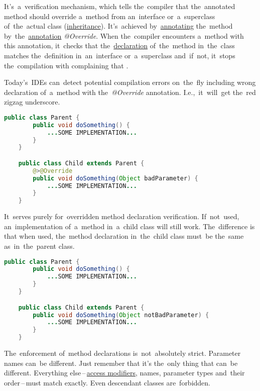 \label{javaoverride}
It's~a~verification mechanism, which tells the~compiler that the~annotated method should override a~method from an~interface or~a~superclass of~the~actual class (\hyperref[inheritance]{inheritance}).
It's~achieved by~\hyperref[javaannotation]{annotating} the~method by~the~\hyperref[javaannotation]{annotation} \textit{@Override}.
When the~compiler encounters a~method with this annotation, it~checks that the~\hyperref[declarationdefinition]{declaration} of~the~method in~the~class matches the~definition in~an~interface or~a~superclass and~if~not, it~stops the~compilation with complaining that .

\note Today's~IDEs can~detect potential compilation errors on~the~fly including wrong declaration of~a~method with the~\textit{@Override} annotation.
I.e.,~it~will~get the~red zigzag underscore.

\begin{lstlisting}[language=Java]
    public class Parent {
        public void doSomething() {
            ...SOME IMPLEMENTATION...
        }
    }

    public class Child extends Parent {
        @>@Override
        public void doSomething(Object badParameter) {
            ...SOME IMPLEMENTATION...
        }
    }
\end{lstlisting}

\warning It~serves purely for~overridden method declaration verification.
If~not~used, an~implementation of~a~method in~a~child class will still work.
The~difference is that when used, the~method declaration in~the~child class must~be the~same as~in~the~parent class.

\begin{lstlisting}[language=Java]
    public class Parent {
        public void doSomething() {
            ...SOME IMPLEMENTATION...
        }
    }

    public class Child extends Parent {
        public void doSomething(Object notBadParameter) {
            ...SOME IMPLEMENTATION...
        }
    }
\end{lstlisting}

\warning The~enforcement of~method declarations is~not~absolutely strict.
Parameter names can~be different.
Just remember that it's the~only thing that can~be different.
Everything else\,--\,\hyperref[javaaccessmodifiers]{access modifiers}, names, parameter types and~their order\,--\,must match exactly.
Even descendant classes are~forbidden.

